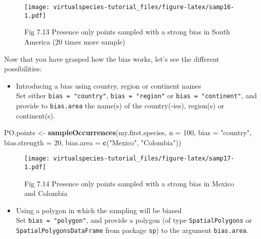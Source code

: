 \documentclass[]{article}
\newenvironment{Shaded}{\begin{snugshade}}{\end{snugshade}}
\newcommand{\KeywordTok}[1]{\textcolor[rgb]{0.13,0.29,0.53}{\textbf{#1}}}
\newcommand{\DataTypeTok}[1]{\textcolor[rgb]{0.13,0.29,0.53}{#1}}
\newcommand{\DecValTok}[1]{\textcolor[rgb]{0.00,0.00,0.81}{#1}}
\newcommand{\StringTok}[1]{\textcolor[rgb]{0.31,0.60,0.02}{#1}}
\newcommand{\NormalTok}[1]{#1}
\providecommand{\tightlist}{%
  \setlength{\itemsep}{0pt}\setlength{\parskip}{0pt}}
\begin{document}
\begin{figure}
\centering
\texttt{[image: virtualspecies-tutorial\_files/figure-latex/samp16-1.pdf]}
\caption{Fig 7.13 Presence only points sampled with a strong bias in
South America (20 times more sample)}
\end{figure}

Now that you have grasped how the bias works, let's see the different
possibilities:

\begin{itemize}
\tightlist
\item
  Introducing a bias using country, region or continent names\\
  Set either \texttt{bias\ =\ "country"}, \texttt{bias\ =\ "region"} or
  \texttt{bias\ =\ "continent"}, and provide to \texttt{bias.area} the
  name(s) of the country(-ies), region(s) or continent(s).
\end{itemize}

\begin{Shaded}
\begin{Highlighting}[]
\NormalTok{PO.points <-}\StringTok{ }\KeywordTok{sampleOccurrences}\NormalTok{(my.first.species,}
                               \DataTypeTok{n =} \DecValTok{100}\NormalTok{, }
                               \DataTypeTok{bias =} \StringTok{"country"}\NormalTok{,}
                               \DataTypeTok{bias.strength =} \DecValTok{20}\NormalTok{,}
                               \DataTypeTok{bias.area =} \KeywordTok{c}\NormalTok{(}\StringTok{"Mexico"}\NormalTok{, }\StringTok{"Colombia"}\NormalTok{))}
\end{Highlighting}
\end{Shaded}

\begin{figure}
\centering
\texttt{[image: virtualspecies-tutorial\_files/figure-latex/samp17-1.pdf]}
\caption{Fig 7.14 Presence only points sampled with a strong bias in
Mexico and Colombia}
\end{figure}

\begin{itemize}
\tightlist
\item
  Using a polygon in which the sampling will be biased\\
  Set \texttt{bias\ =\ "polygon"}, and provide a polygon (of type
  \texttt{SpatialPolygons} or \texttt{SpatialPolygonsDataFrame} from
  package \texttt{sp}) to the argument \texttt{bias.area}.
\end{itemize}
\end{document}
